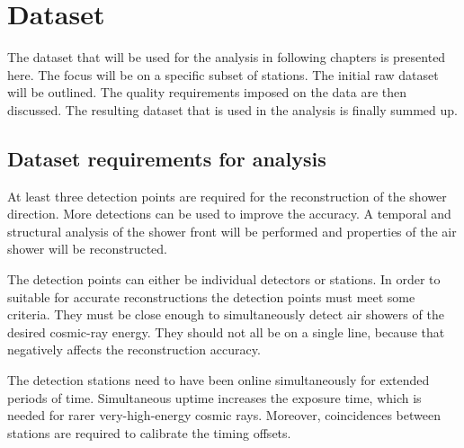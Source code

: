 \chapter{Dataset}
\label{ch:dataset}


The dataset that will be used for the analysis in following chapters is presented here. The focus will be on a specific subset of stations. The initial raw dataset will be outlined. The quality requirements imposed on the data are then discussed. The resulting dataset that is used in the analysis is finally summed up.


\section{Dataset requirements for analysis}

At least three detection points are required for the reconstruction of the shower direction. More detections can be used to improve the accuracy. A temporal and structural analysis of the shower front will be performed and properties of the air shower will be reconstructed.

The detection points can either be individual \hisparc detectors or \hisparc stations. In order to suitable for accurate reconstructions the detection points must meet some criteria. They must be close enough to simultaneously detect air showers of the desired cosmic-ray energy. They should not all be on a single line, because that negatively affects the reconstruction accuracy.

The detection stations need to have been online simultaneously for extended periods of time. Simultaneous uptime increases the exposure time, which is needed for rarer very-high-energy cosmic rays. Moreover, coincidences between stations are required to calibrate the timing offsets.

